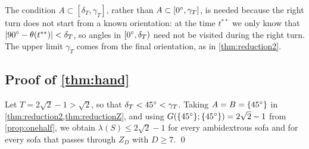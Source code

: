 The condition $A\subset[\delta_T,\gamma_T]$, rather than $A\subset[0^{\circ},\gamma_T]$, is needed because the right turn does not start from a known orientation: at the time $t^{**}$ we only know that $|90^{\circ}-\theta(t^{**})|<\delta_T$, so angles in $[0^{\circ},\delta_T)$ need not be visited during the right turn. The upper limit $\gamma_T$ comes from the final orientation, as in \cref{thm:reduction2}.

\subsection{Proof of \texorpdfstring{\cref{thm:hand}}{Theorem 1.2}}\label{sec:proofhand}

Let $T=2\sqrt2-1>\sqrt2$, so that $\delta_T<45^{\circ}<\gamma_T$. Taking $A=B=\{45^{\circ}\}$ in \cref{thm:reduction2,thm:reductionZ}, and using $G(\{45^{\circ}\};\{45^{\circ}\})=2\sqrt2-1$ from \cref{prop:onehalf}, we obtain $\lambda(S)\le 2\sqrt2-1$ for every ambidextrous sofa and for every sofa that passes through $Z_D$ with $D\ge7$. \qed
